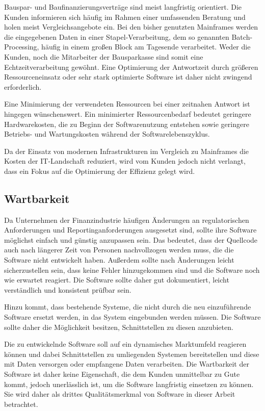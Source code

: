             Bauspar- und Baufinanzierungsverträge sind meist langfristig orientiert. Die Kunden informieren sich häufig im Rahmen einer umfassenden Beratung und holen meist Vergleichsangebote ein. Bei den bisher genutzten Mainframes werden die eingegebenen Daten in einer Stapel-Verarbeitung, dem so genannten Batch-Processing, häufig in einem großen Block am Tagesende verarbeitet. Weder die Kunden, noch die Mitarbeiter der Bausparkasse sind somit eine Echtzeitverarbeitung gewöhnt. Eine Optimierung der Antwortzeit durch größeren Ressourceneinsatz oder sehr stark optimierte Software ist daher nicht zwingend erforderlich.

            Eine Minimierung der verwendeten Ressourcen bei einer zeitnahen Antwort ist hingegen wünschenswert. Ein minimierter Ressourcenbedarf bedeutet geringere Hardwarekosten, die zu Beginn der Softwarenutzung entstehen sowie geringere Betriebs- und Wartungskosten während der Softwarelebenszyklus.

            Da der Einsatz von modernen Infrastrukturen im Vergleich zu Mainframes die Kosten der IT-Landschaft reduziert, wird vom Kunden jedoch nicht verlangt, dass ein Fokus auf die Optimierung der Effizienz gelegt wird.

        \subsection{Wartbarkeit}

            Da Unternehmen der Finanzindustrie häufigen Änderungen an regulatorischen Anforderungen und Reportinganforderungen ausgesetzt sind, sollte ihre Software möglichst einfach und günstig anzupassen sein. Das bedeutet, dass der Quellcode auch nach längerer Zeit von Personen nachvollzogen werden muss, die die Software nicht entwickelt haben. Außerdem sollte nach Änderungen leicht sicherzustellen sein, dass keine Fehler hinzugekommen sind und die Software noch wie erwartet reagiert.
            Die Software sollte daher gut dokumentiert, leicht verständlich und konsistent prüfbar sein.

            Hinzu kommt, dass bestehende Systeme, die nicht durch die neu einzuführende Software ersetzt werden, in das System eingebunden werden müssen. Die Software sollte daher die Möglichkeit besitzen, Schnittstellen zu diesen anzubieten.

            Die zu entwickelnde Software soll auf ein dynamisches Marktumfeld reagieren können und dabei Schnittstellen zu umliegenden Systemen bereitstellen und diese mit Daten versorgen oder empfangene Daten verarbeiten. Die Wartbarkeit der Software ist daher keine Eigenschaft, die dem Kunden unmittelbar zu Gute kommt, jedoch unerlässlich ist, um die Software langfristig einsetzen zu können.
            Sie wird daher als drittes Qualitätsmerkmal von Software in dieser Arbeit betrachtet.

